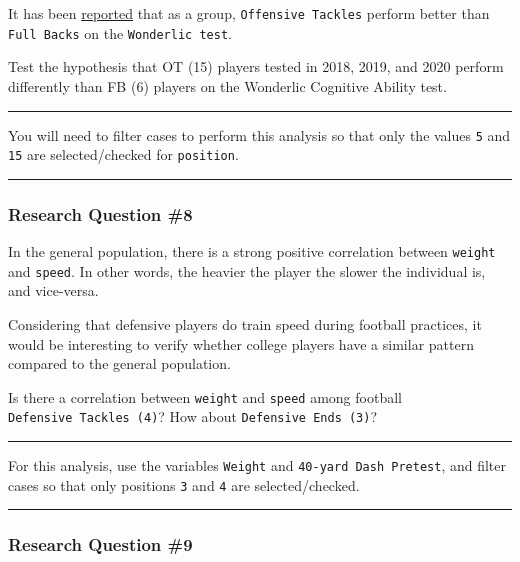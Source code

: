 \documentclass[
]{article}
\begin{document}
It has been \href{https://www.cbssports.com/nfl/news/nfl-draft-combine-the-highest-and-lowest-wonderlic-test-scores-ever-recorded/}{reported} that as a group, \texttt{Offensive\ Tackles} perform better than \texttt{Full\ Backs} on the \texttt{Wonderlic\ test}.

Test the hypothesis that OT (15) players tested in 2018, 2019, and 2020 perform differently than FB (6) players on the Wonderlic Cognitive Ability test.

\begin{center}\rule{0.5\linewidth}{0.5pt}\end{center}

You will need to filter cases to perform this analysis so that only the values \texttt{5} and \texttt{15} are selected/checked for \texttt{position}.

\begin{center}\rule{0.5\linewidth}{0.5pt}\end{center}

\hypertarget{research-question-8}{%
\subsubsection{Research Question \#8}\label{research-question-8}}

In the general population, there is a strong positive correlation between \texttt{weight} and \texttt{speed}. In other words, the heavier the player the slower the individual is, and vice-versa.

Considering that defensive players do train speed during football practices, it would be interesting to verify whether college players have a similar pattern compared to the general population.

Is there a correlation between \texttt{weight} and \texttt{speed} among football \texttt{Defensive\ Tackles\ (4)}? How about \texttt{Defensive\ Ends\ (3)}?

\begin{center}\rule{0.5\linewidth}{0.5pt}\end{center}

For this analysis, use the variables \texttt{Weight} and \texttt{40-yard\ Dash\ Pretest}, and filter cases so that only positions \texttt{3} and \texttt{4} are selected/checked.

\begin{center}\rule{0.5\linewidth}{0.5pt}\end{center}

\hypertarget{research-question-9}{%
\subsubsection{Research Question \#9}\label{research-question-9}}
\end{document}
